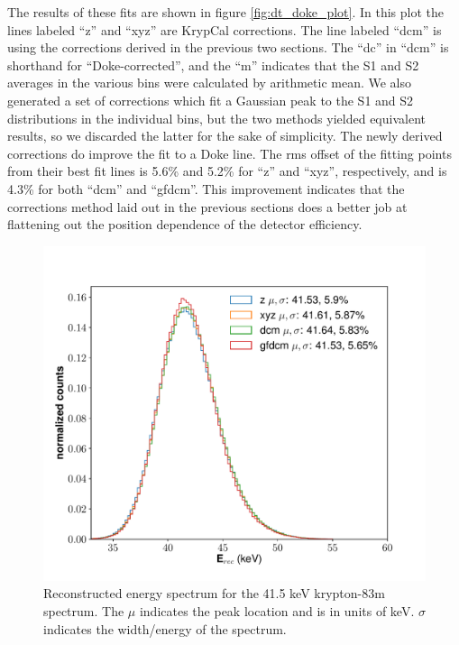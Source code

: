 The results of these fits are shown in figure \ref{fig:dt_doke_plot}. In this plot the lines labeled ``z'' and ``xyz'' are KrypCal corrections. The line labeled ``dcm'' is using the corrections derived in the previous two sections. The ``dc'' in ``dcm'' is shorthand for ``Doke-corrected'', and the ``m'' indicates that the S1 and S2 averages in the various bins were calculated by arithmetic mean. We also generated a set of corrections which fit a Gaussian peak to the S1 and S2 distributions in the individual bins, but the two methods yielded equivalent results, so we discarded the latter for the sake of simplicity. The newly derived corrections do improve the fit to a Doke line. The rms offset of the fitting points from their best fit lines is 5.6\% and 5.2\% for ``z'' and ``xyz'', respectively, and is 4.3\% for both ``dcm'' and ``gfdcm''. This improvement indicates that the corrections method laid out in the previous sections does a better job at flattening out the position dependence of the detector efficiency.
\begin{figure}[h!]
  \centering
  \includegraphics[width=\textwidth]{Figures/E_spec_Kr.pdf}
  \caption{Reconstructed energy spectrum for the 41.5 keV krypton-83m spectrum. The $\mu$ indicates the peak location and is in units of keV. $\sigma$ indicates the width/energy of the spectrum.}
\label{fig:E_spec_Kr} 
\end{figure}

